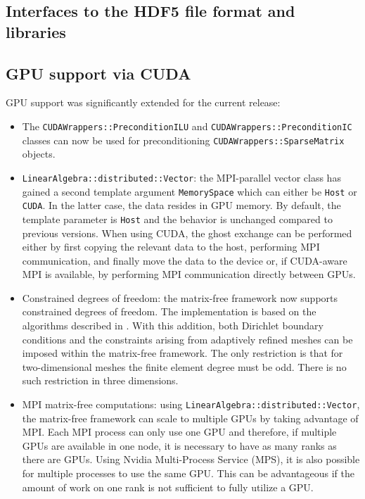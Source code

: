 \documentclass{ansarticle-preprint}
\begin{document}
\subsection{Interfaces to the HDF5 file format and libraries}
\label{subsec:hdf5}


\subsection{GPU support via CUDA}
\label{subsec:gpu}

GPU support was significantly extended for the current release:
\begin{itemize}
  \item The \texttt{CUDAWrappers::PreconditionILU} and \texttt{CUDAWrappers::PreconditionIC}
    classes can now be used for preconditioning \texttt{CUDAWrappers::SparseMatrix} objects.
  \item \texttt{LinearAlgebra::distributed::Vector}: the MPI-parallel vector
    class has gained a second template argument \texttt{MemorySpace} which can
    either be \texttt{Host} or \texttt{CUDA}. In the latter case, the data
    resides in GPU memory. By default, the template parameter is
    \texttt{Host} and the behavior is unchanged compared to previous versions.
    When using CUDA, the ghost exchange can be performed either by first copying
    the relevant data to the host, performing MPI communication, and finally
    move the data to the device or, if CUDA-aware MPI is available, by
    performing MPI communication directly between GPUs.
  \item Constrained degrees of freedom: the matrix-free framework now
    supports constrained degrees of freedom. The implementation is based on the algorithms described in
    \cite{ljungkvist2017}. With this addition, both Dirichlet
    boundary conditions and the constraints arising from adaptively
    refined meshes can be imposed within the matrix-free framework. The only restriction is that for two-dimensional meshes the
    finite element degree must be odd.  
    There is no such restriction in three
    dimensions.
  \item MPI matrix-free computations: using \texttt{LinearAlgebra::distributed::Vector}, the
    matrix-free framework can scale to multiple GPUs by taking
    advantage of MPI. Each MPI process can only use one GPU and therefore, if
    multiple GPUs are available in one node, it is necessary to have as many
    ranks as there are GPUs. Using Nvidia Multi-Process Service (MPS), it is also possible
    for multiple processes to use the same GPU. This can be advantageous if the
    amount of work on one rank is not sufficient to fully utilize a GPU.
\end{itemize}
\end{document}
